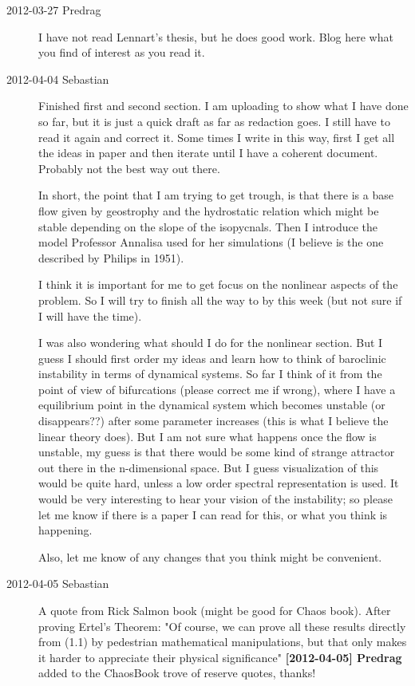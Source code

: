\begin{description}
\item[2012-03-27 Predrag] I have not read Lennart's thesis, but he does good work. Blog
here what you find of interest as you read it.

\item[2012-04-04 Sebastian]
Finished first and second section. I am uploading to show what I have
done so far, but it is just a quick draft as far as redaction goes. I
still have to read it again and correct it. Some times I write in this
way, first I get all the ideas in paper and then iterate until I have a
coherent document. Probably not the best way out there.

In short, the point that I am trying to get trough, is that there is a
base flow given by geostrophy and the hydrostatic relation which might be
stable depending on the slope of the isopycnals. Then I introduce the
model Professor Annalisa used for her simulations (I believe is the one
described by Philips in 1951).

I think it is important for me to get focus on the nonlinear aspects of
the problem. So I will try to finish all the way to
 by this week (but not sure if I will have the time).

I was also wondering what should I do for the nonlinear section. But I
guess I should first order my ideas and learn how to think of baroclinic
instability in terms of dynamical systems. So far I think of it from the
point of view of bifurcations (please correct me if wrong), where I have
a equilibrium point in the dynamical system which becomes unstable (or
disappears??) after some parameter increases (this is what I believe the
linear theory does). But I am not sure what happens once the flow is
unstable, my guess is that there would be some kind of strange attractor
out there in the n-dimensional space. But I guess visualization of this
would be quite hard, unless a low order spectral representation is used.
It would be very interesting to hear your vision of the instability; so
please let me know if there is a paper I can read for this, or what you
think is happening.

Also, let me know of any changes that you think might be convenient.

\item[2012-04-05 Sebastian]
A quote from Rick Salmon book (might be good for Chaos book). After
proving Ertel's Theorem: "Of course, we can prove all these results
directly from (1.1)
by pedestrian mathematical
manipulations, but that only makes it harder to appreciate their physical
significance" {\bf [2012-04-05] Predrag} added to the ChaosBook trove of
reserve quotes, thanks!


\end{description}
